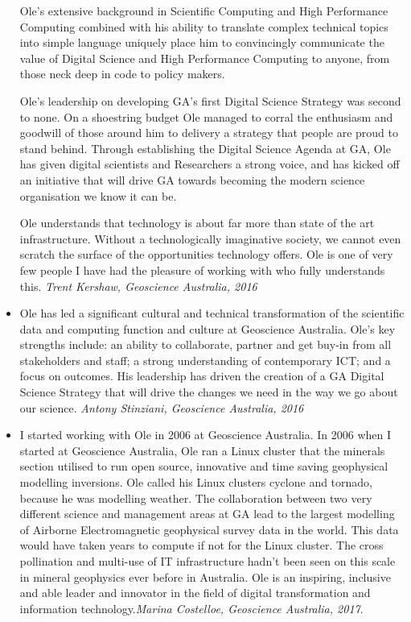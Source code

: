 \documentclass[11pt,a4paper]{article}
\begin{document}
\begin{itemize}
Ole’s extensive background in Scientific Computing and High Performance Computing combined with his ability to translate complex technical topics into simple language uniquely place him to convincingly communicate the value of Digital Science and High Performance Computing to anyone, from those neck deep in code to policy makers.

Ole’s leadership on developing GA’s first Digital Science Strategy was second to none. On a shoestring budget Ole managed to corral the enthusiasm and goodwill of those around him to delivery a strategy that people are proud to stand behind. Through establishing the Digital Science Agenda at GA, Ole has given digital scientists and Researchers a strong voice, and has kicked off an initiative that will drive GA towards becoming the modern science organisation we know it can be.

Ole understands that technology is about far more than state of the art infrastructure. Without a technologically imaginative society, we cannot even scratch the surface of the opportunities technology offers. Ole is one of very few people I have had the pleasure of working with who fully understands this.
\emph{Trent Kershaw, Geoscience Australia, 2016}

\item
  Ole has led a significant cultural and technical transformation of the scientific data and computing function and culture at Geoscience Australia.  Ole’s key strengths include: an ability to collaborate, partner and get buy-in from all stakeholders and staff; a strong understanding of contemporary ICT; and a focus on outcomes.  His leadership has driven the creation of a GA Digital Science Strategy that will drive the changes we need in the way we go about our science.
  \emph{Antony Stinziani, Geoscience Australia, 2016}

\item   I started working with Ole in 2006 at Geoscience Australia. In 2006 when I started at Geoscience Australia, Ole ran a Linux cluster that the minerals section utilised to run open source, innovative and time saving geophysical modelling inversions. Ole called his Linux clusters cyclone and tornado, because he was modelling weather. The collaboration between two very different science and management areas at GA lead to the largest modelling of Airborne Electromagnetic geophysical survey data in the world. This data would have taken years to compute if not for the Linux cluster. The cross pollination and multi-use of IT infrastructure hadn’t been seen on this scale in mineral geophysics ever before in Australia. Ole is an inspiring, inclusive and able leader and innovator in the field of digital transformation and information technology.\emph{Marina Costelloe, Geoscience Australia, 2017}.



\end{itemize}
\end{document}
